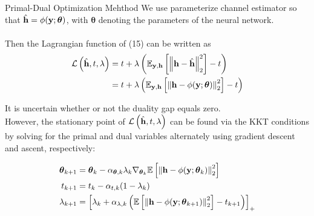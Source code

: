\documentclass[hyperref={bookmarks=false}]{beamer}
\begin{document}
\begin{frame}[allowframebreaks]{Primal-Dual Optimization Mehthod}
We use parameterize channel estimator so that $\hat{{\bf h}}=\phi(\mathbf{y};\boldsymbol{\theta})$, 
with $\boldsymbol{\theta}$ denoting the parameters of the neural network.
\\ \hspace*{\fill} \\
Then the Lagrangian function of (15) can be written as
\begin{equation*}
    \begin{split}
        \mathcal{L} \left(\hat{{\bf h}},t,\lambda\right)
        &= t + \lambda\left(\mathbb{E}_{{\bf y},{\bf h}}\left[\left\| {\bf h}-\hat{{\bf h}} \right\|^2_2 \right] -t \right)\\
        &= t + \lambda\left(\mathbb{E}_{{\bf y},{\bf h}}\left[\left\| {\bf h}-\phi(\mathbf{y};\boldsymbol{\theta}) \right\|^2_2 \right] -t \right)
    \end{split}
\end{equation*}
\framebreak

It is uncertain whether or not the duality gap equals zero.\\
However, the stationary point of $  \mathcal{L} \left(\hat{{\bf h}},t,\lambda\right)$
can be found via the KKT conditions by solving for the primal and dual
variables alternately using gradient descent and ascent, respectively:

\begin{equation*}
    \begin{split}
        \boldsymbol{\theta}_{k+1} &= \boldsymbol{\theta}_{k} - 
            \alpha_{\boldsymbol{\theta},k} \lambda_k \nabla_{\boldsymbol{\theta}_k}
            \mathbb{E}\left[\left\| {\bf h}-\phi(\mathbf{y};\boldsymbol{\theta}_k) \right\|^2_2 \right]\\
        t_{k+1} &= t_{k} - \alpha_{t,k}(1-\lambda_k)\\
        \lambda_{k+1} &= \left[ \lambda_k + \alpha_{\lambda,k}
            \left( \mathbb{E}\left[\left\| {\bf h}-\phi(\mathbf{y};\boldsymbol{\theta}_{k+1}) \right\|^2_2 \right] 
            -t_{k+1}\right)\right]_{+}
    \end{split}
\end{equation*}

\end{frame}
\end{document}
